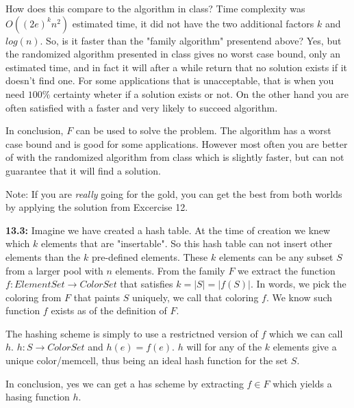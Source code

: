 \documentclass[a4paper,11pt]{article}
\begin{document}
How does this compare to the algorithm in class?
Time complexity was $O((2e)^kn^2)$ estimated time,
it did not have the two additional factors $k$ and $log(n)$.
So, is it faster than the "family algorithm" presentend above?
Yes, but the randomized algorithm presented in class gives no
worst case bound, only an estimated time, and in fact it will
after a while return that no solution exists if it doesn't find
one. For some applications that is unacceptable, that is when
you need $100\%$ certainty wheter if a solution exists or not.
On the other hand you are often satisfied with a faster and
very likely to succeed algorithm.

In conclusion, $F$ can be used to solve the problem.
The algorithm has a worst case bound and is good for some
applications. However most often you are better of with
the randomized algorithm from class which is slightly faster,
but can not guarantee that it will find a solution.

Note: If you are \emph{really} going for the gold, you
can get the best from both worlds by applying the solution
from Excercise 12.

\textbf{13.3:} Imagine we have created a hash table.
At the time of creation we knew which $k$ elements
that are "insertable". So this hash table can not insert
other elements than the $k$ pre-defined elements.
These $k$ elements can be any subset $S$ from a larger pool
with $n$ elements. From the family $F$ we extract the function
$f : ElementSet \to ColorSet$ that satisfies $k=|S|=|f(S)|$.
In words, we pick the coloring
from $F$ that paints $S$ uniquely, we call that coloring $f$.
We know such function $f$ exists as of the definition of $F$.

The hashing scheme is simply to use a restrictned
version of $f$ which we can call $h$. $h : S \to ColorSet$
and $h(e) = f(e)$. $h$ will for any of the $k$ elements
give a unique color/memcell, thus being an ideal hash
function for the set $S$.

In conclusion, yes we can get a has scheme by extracting
$f \in F$ which yields a hasing function $h$.
\end{document}
